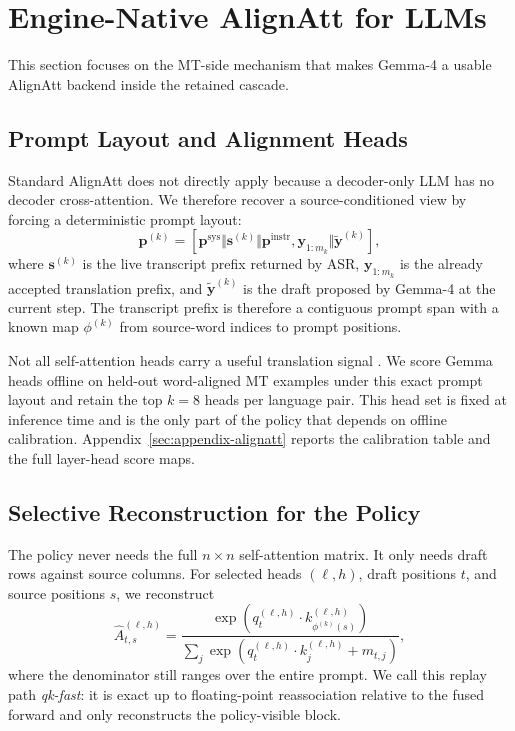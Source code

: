 \documentclass[11pt]{article}
\begin{document}


\section{Engine-Native AlignAtt for LLMs}
\label{sec:method}

This section focuses on the MT-side mechanism that makes Gemma-4 a usable
AlignAtt backend inside the retained cascade.

\subsection{Prompt Layout and Alignment Heads}

Standard AlignAtt does not directly apply because a decoder-only LLM has no
decoder cross-attention. We therefore recover a source-conditioned view by
forcing a deterministic prompt layout:
\begin{equation}
\mathbf{p}^{(k)} =
\left[\mathbf{p}^{\mathrm{sys}}
\Vert \mathbf{s}^{(k)}
\Vert \mathbf{p}^{\mathrm{instr}}, \mathbf{y}_{1:m_k}
\Vert \widetilde{\mathbf{y}}^{(k)}\right],
\label{eq:mt-prompt}
\end{equation}
where $\mathbf{s}^{(k)}$ is the live transcript prefix returned by ASR,
$\mathbf{y}_{1:m_k}$ is the already accepted translation prefix, and
$\widetilde{\mathbf{y}}^{(k)}$ is the draft proposed by Gemma-4 at the current
step. The transcript prefix is therefore a contiguous prompt span with a known
map $\phi^{(k)}$ from source-word indices to prompt positions.

Not all self-attention heads carry a useful translation signal
\citep{tokenheads26}. We score Gemma heads offline on held-out word-aligned MT
examples under this exact prompt layout and retain the top $k=8$ heads per
language pair. This head set is fixed at inference time and is the only part
of the policy that depends on offline calibration.
Appendix~\ref{sec:appendix-alignatt} reports the calibration table and the full
layer-head score maps.

\subsection{Selective Reconstruction for the Policy}

The policy never needs the full $n\times n$ self-attention matrix. It only
needs draft rows against source columns. For selected heads $(\ell,h)$, draft
positions $t$, and source positions $s$, we reconstruct
\begin{equation}
\widehat{A}^{(\ell,h)}_{t,s}
=
\frac{\exp\!\left(q^{(\ell,h)}_t \cdot k^{(\ell,h)}_{\phi^{(k)}(s)}\right)}
{\sum_j \exp\!\left(q^{(\ell,h)}_t \cdot k^{(\ell,h)}_j + m_{t,j}\right)},
\label{eq:mt-qk-fast}
\end{equation}
where the denominator still ranges over the entire prompt. We call this replay
path \emph{qk-fast}: it is exact up to floating-point reassociation relative to
the fused forward and only reconstructs the policy-visible block.
\end{document}
